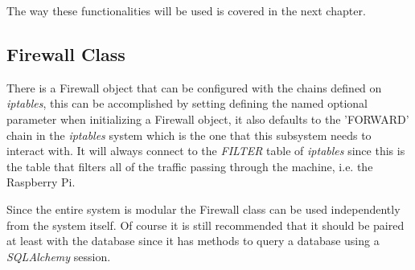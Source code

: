 {The way these functionalities will be used is covered in the next chapter.

\subsection{Firewall Class}
\label{chap4:sec:firewall-sys:firewall-class}
There is a Firewall object that can be configured with the chains defined on
\emph{iptables}, this can be accomplished by setting defining the named optional
parameter when initializing a Firewall object, it also defaults to the 'FORWARD'
chain in the \emph{iptables} system which is the one that this subsystem needs
to interact with. It will always connect to the \emph{FILTER} table of
\emph{iptables} since this is the table that filters all of the traffic passing
through the machine, i.e. the Raspberry Pi.

Since the entire system is modular the Firewall class can be used independently
from the system itself. Of course it is still recommended that it should be
paired at least with the database since it has methods to query a database using
a \emph{SQLAlchemy} session.

}
